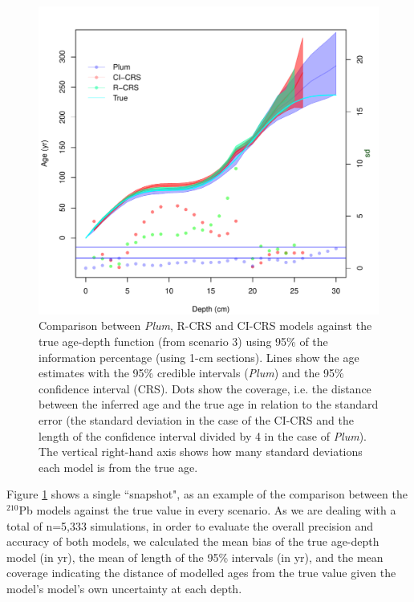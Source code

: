 \documentclass [10pt] {article}
\begin{document}
\begin{figure}[!]
	\centering
	\includegraphics[width=\linewidth]{95Comparison.pdf}
		\caption{Comparison between \textit{Plum}, R-CRS and CI-CRS models against the true age-depth function (from scenario 3) using 95\% of the information percentage (using 1-cm sections). Lines show the age estimates with the 95\% credible intervals (\textit{Plum}) and the 95\% confidence interval (CRS). Dots show the coverage, i.e. the distance between the inferred age and the true age in relation to the standard error (the standard deviation in the case of the CI-CRS and the length of the confidence interval divided by 4 in the case of \textit{Plum}). The vertical right-hand axis shows how many standard deviations each model is from the true age.  }
		\label{fig:comparison1r}
\end{figure}

Figure \ref{fig:comparison1r} shows a single ``snapshot", as an example of the comparison between the $^{210}$Pb models against the true value in every scenario. 
As we are dealing with a total of n=5,333 simulations, in order to evaluate the overall precision and accuracy of both models, we calculated the mean bias of the true age-depth model (in yr), the mean of length of the 95\% intervals (in yr), and the mean coverage indicating the distance of modelled ages from the true value given the model’s model's own uncertainty at each depth.
\end{document}
